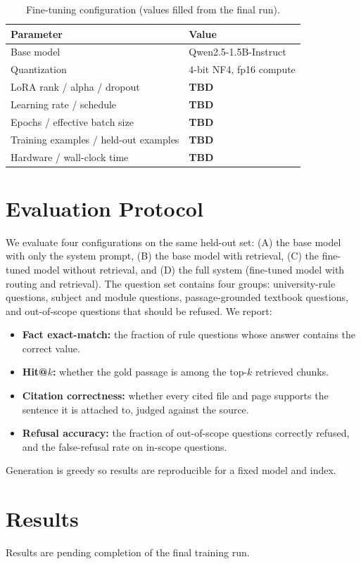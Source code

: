 \documentclass[conference]{IEEEtran}
\newcommand{\tbd}{\textbf{TBD}}
\begin{document}
\begin{table}[t]
\caption{Fine-tuning configuration (values filled from the final run).}
\label{tab:hp}
\centering
\begin{tabular}{ll}
\toprule
Parameter & Value\\
\midrule
Base model & Qwen2.5-1.5B-Instruct\\
Quantization & 4-bit NF4, fp16 compute\\
LoRA rank / alpha / dropout & \tbd\\
Learning rate / schedule & \tbd\\
Epochs / effective batch size & \tbd\\
Training examples / held-out examples & \tbd\\
Hardware / wall-clock time & \tbd\\
\bottomrule
\end{tabular}
\end{table}

\section{Evaluation Protocol}
We evaluate four configurations on the same held-out set: (A) the base model with only the system prompt, (B) the base model with retrieval, (C) the fine-tuned model without retrieval, and (D) the full system (fine-tuned model with routing and retrieval). The question set contains four groups: university-rule questions, subject and module questions, passage-grounded textbook questions, and out-of-scope questions that should be refused. We report:
\begin{itemize}
\item \textbf{Fact exact-match:} the fraction of rule questions whose answer contains the correct value.
\item \textbf{Hit@$k$:} whether the gold passage is among the top-$k$ retrieved chunks.
\item \textbf{Citation correctness:} whether every cited file and page supports the sentence it is attached to, judged against the source.
\item \textbf{Refusal accuracy:} the fraction of out-of-scope questions correctly refused, and the false-refusal rate on in-scope questions.
\end{itemize}
Generation is greedy so results are reproducible for a fixed model and index.

\section{Results}
\label{sec:results}
Results are pending completion of the final training run.
\end{document}
